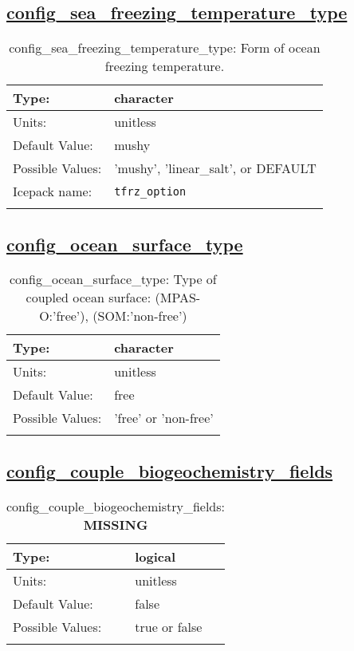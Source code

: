 \subsection[config\_sea\_freezing\_temperature\_type]{\hyperref[sec:nm_tab_ocean]{config\_sea\_freezing\_temperature\_type}}
\label{subsec:nm_sec_config_sea_freezing_temperature_type}
\begin{center}
\begin{longtable}{| p{2.0in} || p{4.0in} |}
    \hline
    Type: & character \\
    \hline
    Units: & \si{unitless} \\
    \hline
    Default Value: & mushy \\
    \hline
    Possible Values: & 'mushy', 'linear\_salt', or DEFAULT \\
    \hline
    Icepack name: & \verb+tfrz_option+ \\
    \hline
    \caption{config\_sea\_freezing\_temperature\_type: Form of ocean freezing temperature.}
\end{longtable}
\end{center}
\subsection[config\_ocean\_surface\_type]{\hyperref[sec:nm_tab_ocean]{config\_ocean\_surface\_type}}
\label{subsec:nm_sec_config_ocean_surface_type}
\begin{center}
\begin{longtable}{| p{2.0in} || p{4.0in} |}
    \hline
    Type: & character \\
    \hline
    Units: & \si{unitless} \\
    \hline
    Default Value: & free \\
    \hline
    Possible Values: & 'free' or 'non-free' \\
    \hline
    \caption{config\_ocean\_surface\_type: Type of coupled ocean surface: (MPAS-O:'free'), (SOM:'non-free')}
\end{longtable}
\end{center}
\subsection[config\_couple\_biogeochemistry\_fields]{\hyperref[sec:nm_tab_ocean]{config\_couple\_biogeochemistry\_fields}}
\label{subsec:nm_sec_config_couple_biogeochemistry_fields}
\begin{center}
\begin{longtable}{| p{2.0in} || p{4.0in} |}
    \hline
    Type: & logical \\
    \hline
    Units: & \si{unitless} \\
    \hline
    Default Value: & false \\
    \hline
    Possible Values: & true or false \\
    \hline
    \caption{config\_couple\_biogeochemistry\_fields: {\bf \color{red} MISSING}}
\end{longtable}
\end{center}

